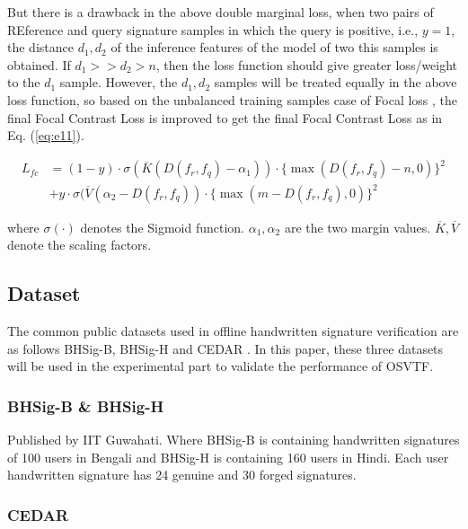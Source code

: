 \documentclass{article}
\begin{document}
But there is a drawback in the above double marginal loss, when two pairs of REference and query signature samples in which the query is positive, i.e., $y=1$, the distance $d_1,d_2$ of the inference features of the model of two this samples is obtained. If $d_1 >> d_2 > n$, then the loss function should give greater loss/weight to the $d_1$ sample. However, the $d_1, d_2$ samples will be treated equally in the above loss function, so based on the unbalanced training samples case of Focal loss \cite{25}, the final Focal Contrast Loss is improved to get the final Focal Contrast Loss as in Eq. (\ref{eq:e11}).

\begin{equation}\label{eq:e11}
	\begin{aligned}
		L_{fc} & = (1 - y) \cdot \sigma(\overline{K}(D(f_r,f_q) - \alpha_1 )) \cdot \{\max(D(f_r, f_q) - n,0) \}^2 \\
		       & + y \cdot \sigma(\overline{V} (\alpha_2 - D(f_r,f_q )) \cdot \{\max(m - D(f_r, f_q), 0)\}^2
	\end{aligned}
\end{equation}


where $\sigma(\cdot)$ denotes the Sigmoid function. $\alpha_1, \alpha_2$ are the two margin values. $\overline{K}, \overline{V}$ denote the scaling factors.

\subsection{Dataset}

The common public datasets used in offline handwritten signature verification are as follows BHSig-B, BHSig-H \cite{26} and CEDAR \cite{27}. In this paper, these three datasets will be used in the experimental part to validate the performance of OSVTF.

\subsubsection*{BHSig-B \& BHSig-H}

Published by IIT Guwahati. Where BHSig-B is containing handwritten signatures of 100 users in Bengali and BHSig-H is containing 160 users in Hindi. Each user handwritten signature has 24 genuine and 30 forged signatures.

\subsubsection*{CEDAR}
\end{document}
